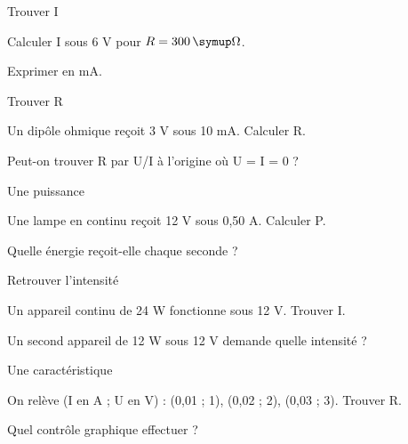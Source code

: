 \par\noindent\begin{minipage}{\linewidth}
\begin{exercice}[1]{Trouver I}
\begin{questions}
\item Calculer I sous 6 V pour $R=300\unite\Omega$.
\item Exprimer en mA.
\end{questions}
\end{exercice}
\end{minipage}
\par\noindent\begin{minipage}{\linewidth}
\begin{exercice}[1]{Trouver R}
\begin{questions}
\item Un dipôle ohmique reçoit 3 V sous 10 mA. Calculer R.
\item Peut-on trouver R par U/I à l’origine où U = I = 0 ?
\end{questions}
\end{exercice}
\end{minipage}
\clearpage{}
\par\noindent\begin{minipage}{\linewidth}
\begin{exercice}[2]{Une puissance}
\begin{questions}
\item Une lampe en continu reçoit 12 V sous 0,50 A. Calculer P.
\item Quelle énergie reçoit-elle chaque seconde ?
\end{questions}
\end{exercice}
\end{minipage}
\par\noindent\begin{minipage}{\linewidth}
\begin{exercice}[2]{Retrouver l’intensité}
\begin{questions}
\item Un appareil continu de 24 W fonctionne sous 12 V. Trouver I.
\item Un second appareil de 12 W sous 12 V demande quelle intensité ?
\end{questions}
\end{exercice}
\end{minipage}
\par\noindent\begin{minipage}{\linewidth}
\begin{exercice}[2]{Une caractéristique}
\begin{questions}
\item On relève (I en A ; U en V) : (0,01 ; 1), (0,02 ; 2), (0,03 ; 3). Trouver R.
\item Quel contrôle graphique effectuer ?
\end{questions}
\end{exercice}
\end{minipage}
